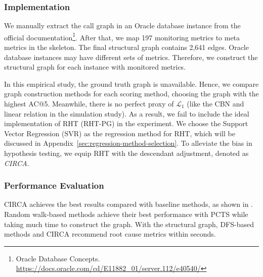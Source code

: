 \subsubsection{Implementation}

We manually extract the call graph in an Oracle database instance from the official documentation\footnote{Oracle Database Concepts. \url{https://docs.oracle.com/cd/E11882_01/server.112/e40540/}}.
After that, we map 197 monitoring metrics to meta metrics in the skeleton.
The final structural graph contains 2,641 edges.
Oracle database instances may have different sets of metrics.
Therefore, we construct the structural graph for each instance with monitored metrics.

In this empirical study, the ground truth graph is unavailable.
Hence, we compare graph construction methods for each scoring method, choosing the graph with the highest AC@5.
Meanwhile, there is no perfect proxy of $\mathcal{L}_{1}$ (like the CBN and linear relation in the simulation study).
As a result, we fail to include the ideal implementation of RHT (RHT-PG) in the experiment.
We choose the Support Vector Regression (SVR) as the regression method for RHT, which will be discussed in Appendix~\ref{sec:regression-method-selection}.
To alleviate the bias in hypothesis testing, we equip RHT with the descendant adjustment, denoted as \textit{CIRCA}.

\subsubsection{Performance Evaluation}

CIRCA achieves the best results compared with baseline methods, as shown in .
Random walk-based methods achieve their best performance with PCTS while taking much time to construct the graph.
With the structural graph, DFS-based methods and CIRCA recommend root cause metrics within seconds.


